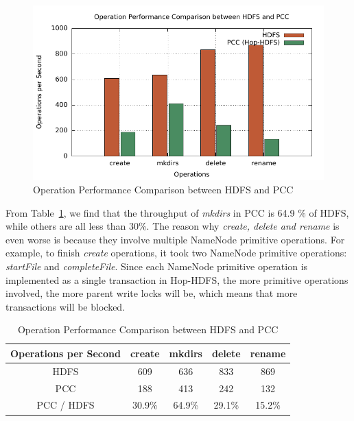 \begin{figure}[h]
	\centering
	\includegraphics[width=\linewidth]{figs/nn_100.pdf}
	\caption{Operation Performance Comparison between HDFS and PCC}
	\label{fig:nntp}
\end{figure}

\noindent From Table~\ref{table:nntpb}, we find that the throughput of \textit{mkdirs} in PCC is 64.9 \% of HDFS, while others are all less than 30\%. The reason why \textit{create, delete and rename} is even worse is because they involve multiple NameNode primitive operations. For example, to finish \textit{create} operations, it took two NameNode primitive operations: \textit{startFile} and \textit{completeFile}. Since each NameNode primitive operation is implemented as a single transaction in Hop-HDFS, the more primitive operations involved, the more parent write locks will be, which means that more transactions will be blocked.

\begin{table}[h]
	\centering
	\begin{tabular}{|c|c|c|c|c|}
		\hline
		\textbf{Operations per Second} & \textbf{create} & \textbf{mkdirs} & \textbf{delete} & \textbf{rename} \\ \hline
		HDFS                           & 609             & 636             & 833             & 869             \\ \hline
		PCC                 & 188             & 413             & 242             & 132             \\ \hline
		PCC / HDFS              & 30.9\%          & 64.9\%          & 29.1\%          & 15.2\%          \\ \hline
	\end{tabular}
	\caption{Operation Performance Comparison between HDFS and PCC}
	\label{table:nntpb}
\end{table}

